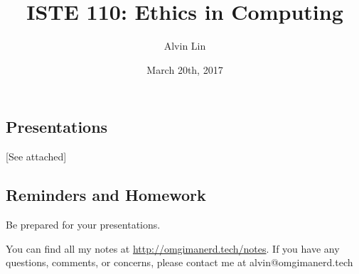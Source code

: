 \documentclass{article}
\title{ISTE 110: Ethics in Computing}
\author{Alvin Lin}
\date{March 20th, 2017}
\begin{document}
\maketitle

\subsection*{Presentations}
[See attached]

\subsection*{Reminders and Homework}
Be prepared for your presentations.

\begin{center}
  You can find all my notes at \url{http://omgimanerd.tech/notes}. If you have
  any questions, comments, or concerns, please contact me at
  alvin@omgimanerd.tech
\end{center}
\end{document}
